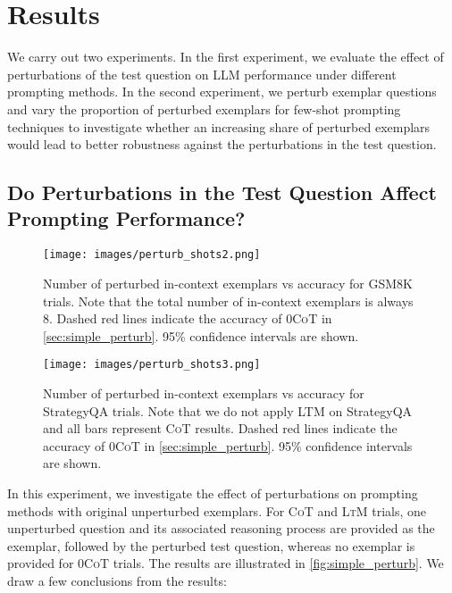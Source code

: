 \documentclass[11pt]{article}
\begin{document}
\section{Results}

We carry out two experiments. In the first experiment, we evaluate the effect of perturbations of the test question on LLM performance under different prompting methods. In the second experiment, we perturb exemplar questions and vary the proportion of perturbed exemplars for few-shot prompting techniques to investigate whether an increasing share of perturbed exemplars would lead to better robustness against the perturbations in the test question.

\subsection{Do Perturbations in the Test Question Affect Prompting Performance?}\label{sec:simple_perturb}

\begin{figure*}[t]
    \centering
    \captionsetup{justification=centering}
    \texttt{[image: images/perturb\_shots2.png]}
    \caption{Number of perturbed in-context exemplars vs accuracy for GSM8K trials. Note that the total number of in-context exemplars is always 8. Dashed red lines indicate the accuracy of \textsc{0CoT} in \autoref{sec:simple_perturb}. 95\% confidence intervals are shown.}
    \label{fig:perturb_shots}
\end{figure*}

\begin{figure*}[t]
    \centering
    \captionsetup{justification=centering}
    \texttt{[image: images/perturb\_shots3.png]}
    \caption{Number of perturbed in-context exemplars vs accuracy for StrategyQA trials. Note that we do not apply \textsc{LTM} on StrategyQA and all bars represent \textsc{CoT} results. Dashed red lines indicate the accuracy of \textsc{0CoT} in \autoref{sec:simple_perturb}. 95\% confidence intervals are shown.}
    \label{fig:perturb_shots2}
\end{figure*}

In this experiment, we investigate the effect of perturbations on prompting methods with original unperturbed exemplars. For \textsc{CoT} and \textsc{LtM} trials, one unperturbed question and its associated reasoning process are provided as the exemplar, followed by the perturbed test question, whereas no exemplar is provided for \textsc{0CoT} trials. The results are illustrated in \autoref{fig:simple_perturb}. We draw a few conclusions from the results:
\end{document}

